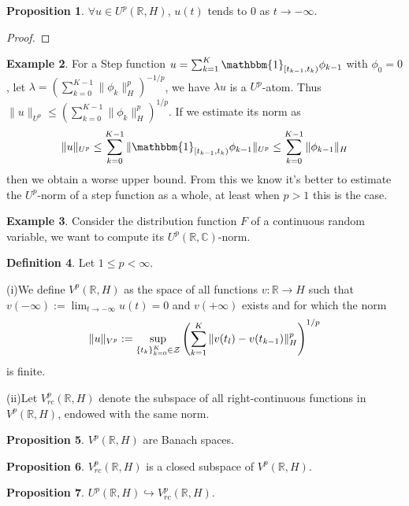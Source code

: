 \documentclass{article}
\theoremstyle{definition}
\newtheorem{definition}{Definition}[subsection]
\newtheorem{proposition}[definition]{Proposition}
\newtheorem{example}[definition]{Example}
\theoremstyle{remark}
\begin{document}
\begin{proposition}
$\forall u\in U^p(\mathbb{R},H)$, $u(t)$ tends to 0 as $t\rightarrow-\infty$. 
\end{proposition}
\begin{proof}

\end{proof}

\begin{example}
For a Step function $u=\sum_{k=1}^K\mathbbm{1}_{[t_{k-1},t_k)}\phi_{k-1}$ with $\phi_0=0$, let $\lambda=\left(\sum_{k=0}^{K-1}\|\phi_k\|_H^p\right)^{-1/p}$, we have $\lambda u$ is a $U^p$-atom. Thus $\|u\|_{U^p}\le\left(\sum_{k=0}^{K-1}\|\phi_k\|_H^p\right)^{1/p}$. If we estimate its norm as 
$$\|u\|_{U^p}\le\sum_{k=0}^{K-1}\|\mathbbm{1}_{[t_{k-1},t_k)}\phi_{k-1}\|_{U^p}\le\sum_{k=0}^{K-1}\|\phi_{k-1}\|_H$$
then we obtain a worse upper bound. From this we know it's better to estimate the $U^p$-norm of a step function as a whole, at least when $p>1$ this is the case. 
\end{example}

\begin{example}
Consider the distribution function $F$ of a continuous random variable, we want to compute its $U^p(\mathbb{R},\mathbb{C})$-norm. 

\end{example}

\begin{definition}
Let $1\le p<\infty$.

(i)We define $V^p(\mathbb{R},H)$ as the space of all functions $v:\mathbb{R}\rightarrow H$ such that $v(-\infty):=\lim_{t\rightarrow-\infty}u(t)=0$ and $v(+\infty)$ exists and for which the norm 
$$\|u\|_{V^p}:=\sup_{\{t_k\}_{k=0}^K\in{\cal Z}}\left(\sum_{k=1}^K\|v(t_l)-v(t_{k-1})\|_H^p\right)^{1/p}$$
is finite. 

(ii)Let $V_{rc}^p(\mathbb{R},H)$ denote the subspace of all right-continuous functions in $V^p(\mathbb{R},H)$, endowed with the same norm. 
\end{definition}

\begin{proposition}
$V^p(\mathbb{R},H)$ are Banach spaces. 
\end{proposition}

\begin{proposition}
$V_{rc}^p(\mathbb{R},H)$ is a closed subspace of $V^p(\mathbb{R},H)$. 
\end{proposition}

\begin{proposition}
$U^p(\mathbb{R},H)\hookrightarrow V_{rc}^p(\mathbb{R},H)$. 
\end{proposition}
\end{document}

